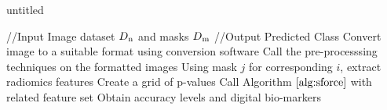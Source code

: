 \documentclass[10pt,journal,compsoc]{IEEEtran}
\begin{document}
\begin{algorithm}[!t]
\caption{untitled}\label{main}
\begin{algorithmic}[1]
\footnotesize
\STATE //Input Image dataset $D\textsubscript{n}$ and masks $D\textsubscript{m}$ 
\STATE //Output Predicted Class
\STATE Convert image to a suitable format using conversion software
\STATE Call the pre-processsing techniques on the formatted images
\STATE Using mask $j$ for corresponding $i$, extract radiomics features
\STATE Create a grid of p-values
\STATE Call Algorithm $\ref{alg:sforce}$ with related feature set
\ENDFOR
\STATE Obtain accuracy levels and digital bio-markers
\ENDFOR
\end{algorithmic}
\end{algorithm}




% 
% 
% 
% 
% 
%  
% 
% 
% 
\end{document}
